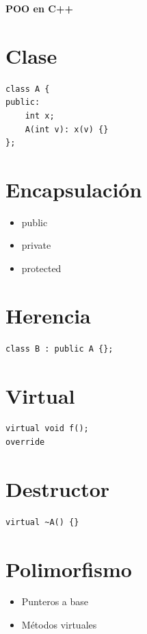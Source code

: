\documentclass[a4paper,10pt]{article}
\begin{document}
\begin{center}
{\Large \textbf{POO en C++}}
\end{center}



\section*{Clase}
\begin{lstlisting}
class A {
public:
    int x;
    A(int v): x(v) {}
};
\end{lstlisting}

\section*{Encapsulación}
\begin{itemize}
\item public
\item private
\item protected
\end{itemize}

\section*{Herencia}
\begin{lstlisting}
class B : public A {};
\end{lstlisting}

\section*{Virtual}
\begin{lstlisting}
virtual void f();
override
\end{lstlisting}

\section*{Destructor}
\begin{lstlisting}
virtual ~A() {}
\end{lstlisting}

\section*{Polimorfismo}
\begin{itemize}
\item Punteros a base
\item Métodos virtuales
\end{itemize}
\end{document}
